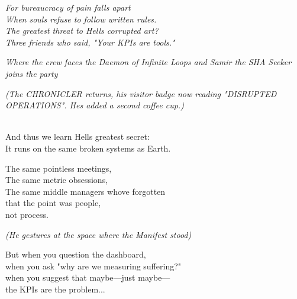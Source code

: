 \emph{For bureaucracy of pain falls apart}\\
\emph{When souls refuse to follow written rules.}\\
\emph{The greatest threat to Hell\textquotesingle s corrupted art?}\\
\emph{Three friends who said, "Your KPIs are tools."}


\emph{Where the crew faces the Daemon of Infinite Loops and Samir the SHA Seeker joins the party}

\bookdivider

\label{performing_arts-closing-of-the-scroll}

\emph{(The CHRONICLER returns, his visitor badge now reading "DISRUPTED OPERATIONS". He\textquotesingle s added a second coffee cup.)}

\\
And thus we learn Hell\textquotesingle s greatest secret:\\
It runs on the same broken systems as Earth.

The same pointless meetings,\\
The same metric obsessions,\\
The same middle managers who\textquotesingle ve forgotten\\
that the point was people,\\
not process.

\emph{(He gestures at the space where the Manifest stood)}

But when you question the dashboard,\\
when you ask "why are we measuring suffering?"\\
when you suggest that maybe---just maybe---\\
the KPIs are the problem...

